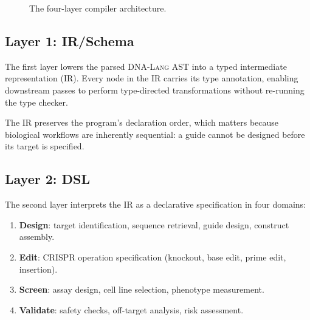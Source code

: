 \documentclass[12pt,a4paper]{article}
\newcommand{\DNALang}{\textsc{DNA-Lang}}
\begin{document}
\begin{figure}[H]
\centering
{}
\caption{The four-layer compiler architecture.}
\label{fig:compiler-layers}
\end{figure}

\subsection{Layer 1: IR/Schema}

The first layer lowers the parsed \DNALang{} AST into a typed intermediate representation (IR). Every node in the IR carries its type annotation, enabling downstream passes to perform type-directed transformations without re-running the type checker.

The IR preserves the program's declaration order, which matters because biological workflows are inherently sequential: a guide cannot be designed before its target is specified.

\subsection{Layer 2: DSL}

The second layer interprets the IR as a declarative specification in four domains:
\begin{enumerate}
    \item \textbf{Design}: target identification, sequence retrieval, guide design, construct assembly.
    \item \textbf{Edit}: CRISPR operation specification (knockout, base edit, prime edit, insertion).
    \item \textbf{Screen}: assay design, cell line selection, phenotype measurement.
    \item \textbf{Validate}: safety checks, off-target analysis, risk assessment.
\end{enumerate}
\end{document}
